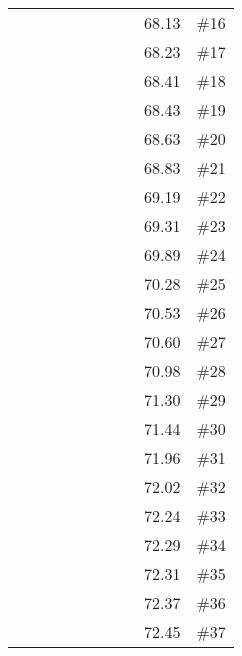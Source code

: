 \begin{longtable}{|c|c|c|c|c|c|c|c|c|c|}
 \x    & \x    & \x    &       & \x\m  & \x    & \x    &       & 68.13 & \#16 \\
 \x    & \x    & \x    & \x    & \x\m  & \x    &       & \x\m  & 68.23 & \#17 \\
 \x    & \x    & \x    & \x    & \x\m  &       &       & \x    & 68.41 & \#18 \\
 \x    & \x    & \x    &       & \x    & \x    & \x    &       & 68.43 & \#19 \\
 \x    & \x    &       & \x    & \x\m  & \x\m  &       & \x\m  & 68.63 & \#20 \\
 \x    & \x    & \x    & \x    & \x\m  &       &       & \x\m  & 68.83 & \#21 \\
 \x    & \x    & \x    &       & \x\m  &       & \x    &       & 69.19 & \#22 \\
 \x    & \x    & \x    & \x    & \x\m  & \x    &       & \x    & 69.31 & \#23 \\
 \x    & \x    & \x    &       & \x\m  &       & \x\m  &       & 69.89 & \#24 \\
 \x    & \x    & \x    & \x    & \x    & \x    &       & \x    & 70.28 & \#25 \\
 \x    & \x    & \x    &       & \x\m  &       & \x\m  &       & 70.53 & \#26 \\
 \x    & \x    & \x    & \x    & \x    & \x\m  &       & \x    & 70.60 & \#27 \\
 \x    & \x    & \x    &       & \x    & \x    &       &       & 70.98 & \#28 \\
 \x    & \x    & \x    &       & \x\m  & \x    &       & \x    & 71.30 & \#29 \\
 \x    & \x    & \x    &       & \x    & \x\m  &       &       & 71.44 & \#30 \\
 \x    & \x    & \x    &       &       &       &       &       & 71.96 & \#31 \\
 \x    & \x    & \x    & \x    & \x    &       &       & \x    & 72.02 & \#32 \\
 \x    & \x    & \x    & \x    & \x\m  &       & \x    &       & 72.24 & \#33 \\
 \x    & \x    & \x    &       & \x\m  & \x    & \x\m  &       & 72.29 & \#34 \\
 \x    & \x    & \x    &       & \x\m  & \x\m  &       &       & 72.31 & \#35 \\
 \x    & \x    & \x    & \x    & \x    & \x    &       & \x\m  & 72.37 & \#36 \\
 \x    & \x    & \x    &       & \x    & \x    &       & \x    & 72.45 & \#37 \\

\end{longtable}

